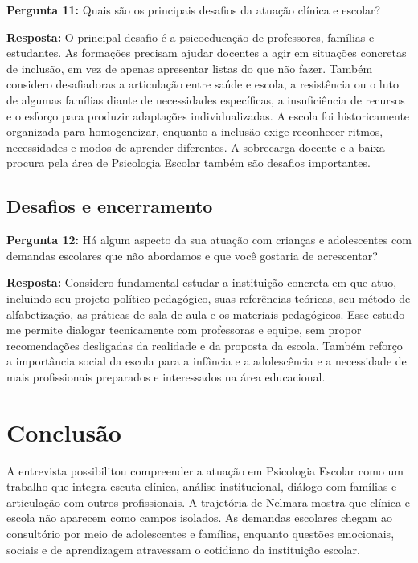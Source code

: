 \documentclass[12pt,a4paper,oneside]{abntex2}
\begin{document}
\noindent\textbf{Pergunta 11:} Quais são os principais desafios da atuação clínica e escolar?

\noindent\textbf{Resposta:} O principal desafio é a psicoeducação de professores, famílias e estudantes. As formações precisam ajudar docentes a agir em situações concretas de inclusão, em vez de apenas apresentar listas do que não fazer. Também considero desafiadoras a articulação entre saúde e escola, a resistência ou o luto de algumas famílias diante de necessidades específicas, a insuficiência de recursos e o esforço para produzir adaptações individualizadas. A escola foi historicamente organizada para homogeneizar, enquanto a inclusão exige reconhecer ritmos, necessidades e modos de aprender diferentes. A sobrecarga docente e a baixa procura pela área de Psicologia Escolar também são desafios importantes.

\section{Desafios e encerramento}

\noindent\textbf{Pergunta 12:} Há algum aspecto da sua atuação com crianças e adolescentes com demandas escolares que não abordamos e que você gostaria de acrescentar?

\noindent\textbf{Resposta:} Considero fundamental estudar a instituição concreta em que atuo, incluindo seu projeto político-pedagógico, suas referências teóricas, seu método de alfabetização, as práticas de sala de aula e os materiais pedagógicos. Esse estudo me permite dialogar tecnicamente com professoras e equipe, sem propor recomendações desligadas da realidade e da proposta da escola. Também reforço a importância social da escola para a infância e a adolescência e a necessidade de mais profissionais preparados e interessados na área educacional.

\chapter{Conclusão}

A entrevista possibilitou compreender a atuação em Psicologia Escolar como um trabalho que integra escuta clínica, análise institucional, diálogo com famílias e articulação com outros profissionais. A trajetória de Nelmara mostra que clínica e escola não aparecem como campos isolados. As demandas escolares chegam ao consultório por meio de adolescentes e famílias, enquanto questões emocionais, sociais e de aprendizagem atravessam o cotidiano da instituição escolar.
\end{document}
